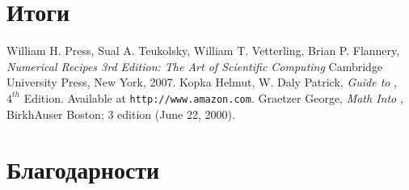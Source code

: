 \documentclass[openany]{book}
\theoremstyle{definition}
\begin{document}
\chapter{Итоги}\label{ch7}
\pagestyle{fancy}

\backmatter

\begin{thebibliography}{99}
    \textenglish{William H. Press, Sual A. Teukolsky, William T. Vetterling, Brian P. Flannery, \emph{Numerical Recipes 3rd Edition: The Art of Scientific Computing}
    Cambridge University Press, New York, 2007.}
    \textenglish{Kopka Helmut, W. Daly Patrick,
    \emph{Guide to \text{\LaTeX}}, $4^{th}$ Edition. Available at \texttt{http://www.amazon.com}.}
    \textenglish{Graetzer George, \emph{Math Into \text{\LaTeX}},
    BirkhAuser Boston; 3 edition (June 22, 2000).}    
\end{thebibliography}


\chapter{Благодарности}
\pagestyle{fancy}
\end{document}
